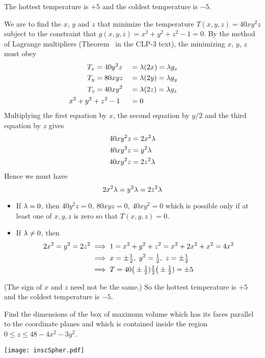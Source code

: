 \begin{answer}
The hottest temperature is $+5$ and the coldest temperature
is $-5$.
\end{answer}

\begin{solution}
We are to find the $x$, $y$ and $z$ that minimize the temperature 
$T(x,y,z)=40xy^2z$ subject to the constraint that 
$g(x,y,z)=x^2+y^2+z^2-1=0$. By the method of
Lagrange multipliers (Theorem~ in the CLP-3 text),
the minimizing $x$, $y$, $z$ must obey
\begin{alignat*}{3}
T_x&=40y^2z&&=\la(2x)=\la g_x \\
T_y&=80xyz&&=\la(2y)=\la g_y \\
T_z&=40xy^2&&=\la(2z)=\la g_z \\
&\hskip-0.5in x^2+y^2+z^2-1&&=0
\end{alignat*}
Multiplying the first equation by $x$, the second equation by $y/2$ 
and the third equation by $z$ gives
\begin{align*}
40xy^2z&=2x^2\lambda \\
40xy^2z&=y^2\lambda \\
40xy^2z&=2z^2\lambda
\end{align*}
Hence we must have
\begin{equation*}
2x^2\lambda=y^2\lambda=2z^2\lambda
\end{equation*}
\begin{itemize}
\item 
If $\lambda=0$, then $40y^2z=0,\ 80xyz=0,\ 40xy^2=0$ which is possible only
if at least one of $x,y,z$ is zero so that $T(x,y,z)=0$. 
\item 
If $\lambda\ne 0$, then 
\begin{align*}
2x^2=y^2=2z^2
&\implies 1=x^2+y^2+z^2=x^2+2x^2+x^2=4x^2 \\
&\implies x=\pm\tfrac{1}{2},\ y^2=\tfrac{1}{2},\ z=\pm \tfrac{1}{2} \\
&\implies T=40\big(\pm\tfrac{1}{2})\tfrac{1}{2}\big(\pm\tfrac{1}{2})=\pm 5
\end{align*}
\end{itemize}
(The sign of $x$ and $z$ need not be the same.)
So the hottest temperature is $+5$ and the coldest temperature
is $-5$.
\end{solution}

\begin{question}[M200 2002A] %
Find the dimensions of the box of maximum volume which has
its faces parallel to the coordinate planes and which is contained inside
the region $0\le z\le 48-4x^2-3y^2$.
\begin{center}
     \texttt{[image: inscSpher.pdf]}
\end{center}
\end{question}

